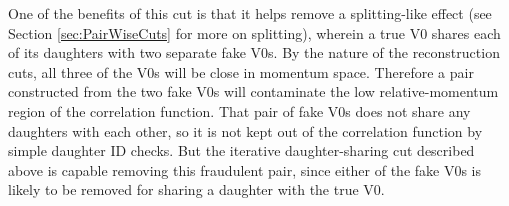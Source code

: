 
One of the benefits of this cut is that it helps remove a splitting-like effect (see Section \ref{sec:PairWiseCuts} for more on splitting), wherein a true V0 shares each of its daughters with two separate fake V0s.  
By the nature of the reconstruction cuts, all three of the V0s will be close in momentum space.  
Therefore a pair constructed from the two fake V0s will contaminate the low relative-momentum region of the correlation function.  
That pair of fake V0s does not share any daughters with each other, so it is not kept out of the correlation function by simple daughter ID checks.  
But the iterative daughter-sharing cut described above is capable removing this fraudulent pair, since either of the fake V0s is likely to be removed for sharing a daughter with the true V0.
